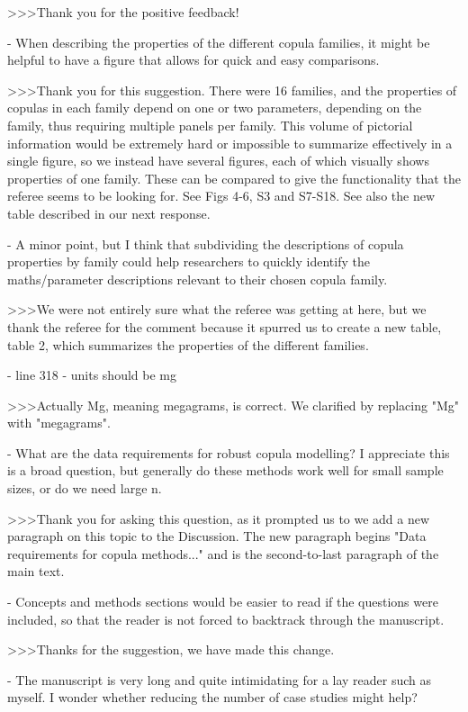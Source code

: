 >>>Thank you for the positive feedback!

- When describing the properties of the different copula families, it might be helpful to have a
figure that allows for quick and easy comparisons.

>>>Thank you for this suggestion. There were 16 families, and the properties
of copulas in each family depend on one or two parameters, depending on the
family, thus requiring multiple panels per family. This volume of pictorial
information would be extremely hard or impossible to summarize effectively in a
single figure, so we instead have several figures, each of which visually
shows properties of one family. These can be compared to give the functionality that
the referee seems to be looking for. See Figs 4-6, S3 and S7-S18. See also the new
table described in our next response.

- A minor point, but I think that subdividing the descriptions of copula properties by family could
help researchers to quickly identify the maths/parameter descriptions relevant to their chosen copula
family.

>>>We were not entirely sure what the referee was getting at here, but we
thank the referee for the comment because it spurred us to create a new table,
table 2, which summarizes the properties of the different families.

- line 318 - units should be mg

>>>Actually Mg, meaning megagrams, is correct. We clarified by replacing "Mg"
with "megagrams".

- What are the data requirements for robust copula modelling? I appreciate this
is a broad question, but generally do these methods work well for small sample
sizes, or do we need large n.

>>>Thank you for asking this question, as it prompted us to we add a new paragraph
on this topic to the Discussion. The new paragraph begins "Data requirements for
copula methods..." and is the second-to-last paragraph of the main text.

- Concepts and methods sections would be easier to read if the questions were
included, so that the reader is not forced to backtrack through the manuscript.

>>>Thanks for the suggestion, we have made this change.

- The manuscript is very long and quite intimidating for a lay reader such as myself. I wonder whether reducing the number of case studies might help?

